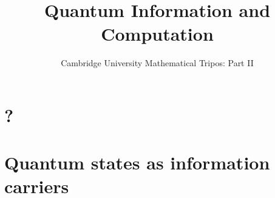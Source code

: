 \documentclass{article}
\title{Quantum Information and Computation}
\author{Cambridge University Mathematical Tripos: Part II}
\begin{document}
\maketitle

\tableofcontentsnewpage{}

\section{?}

\section{Quantum states as information carriers}

\end{document}
